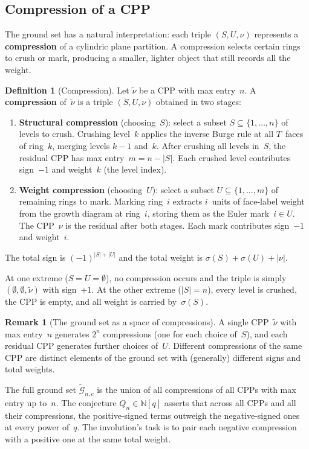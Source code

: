 \documentclass[11pt]{article}
\newcommand{\N}{\mathbb{N}}
\theoremstyle{plain}
\theoremstyle{definition}
\newtheorem{definition}[theorem]{Definition}
\newtheorem{remark}[theorem]{Remark}
\begin{document}
\subsection{Compression of a CPP}
\label{sec:compression}

The ground set has a natural interpretation: each triple
$(S, U, \nu)$ represents a \textbf{compression} of a cylindric
plane partition.  A compression selects certain rings to crush
or mark, producing a smaller, lighter object that still records
all the weight.

\begin{definition}[Compression]
\label{def:compression}
Let $\tilde{\nu}$ be a CPP with max entry~$n$.  A
\textbf{compression} of~$\tilde{\nu}$ is a triple
$(S, U, \nu)$ obtained in two stages:
\begin{enumerate}
  \item \textbf{Structural compression} (choosing~$S$): select a
    subset $S \subseteq \{1, \ldots, n\}$ of levels to crush.
    Crushing level~$k$ applies the inverse Burge rule at all
    $T$~faces of ring~$k$, merging levels $k{-}1$ and~$k$.  After
    crushing all levels in~$S$, the residual CPP has max
    entry~$m = n - |S|$.  Each crushed level contributes sign~$-1$
    and weight~$k$ (the level index).
  \item \textbf{Weight compression} (choosing~$U$): select a
    subset $U \subseteq \{1, \ldots, m\}$ of remaining rings to
    mark.  Marking ring~$i$ extracts $i$~units of face-label
    weight from the growth diagram at ring~$i$, storing them as
    the Euler mark~$i \in U$.  The CPP~$\nu$ is the residual
    after both stages.  Each mark contributes sign~$-1$ and
    weight~$i$.
\end{enumerate}
The total sign is $(-1)^{|S|+|U|}$ and the total weight is
$\sigma(S) + \sigma(U) + |\nu|$.
\end{definition}

\noindent
At one extreme ($S = U = \emptyset$), no compression occurs and
the triple is simply $(\emptyset, \emptyset, \tilde{\nu})$ with
sign~$+1$.  At the other extreme ($|S| = n$), every level is
crushed, the CPP is empty, and all weight is carried by~$\sigma(S)$.

\begin{remark}[The ground set as a space of compressions]
\label{rmk:compression-space}
A single CPP~$\tilde{\nu}$ with max entry~$n$ generates $2^n$
compressions (one for each choice of~$S$), and each residual CPP
generates further choices of~$U$.  Different compressions of the
same CPP are distinct elements of the ground set with
(generally) different signs and total weights.

The full ground set $\widetilde{\mathcal{G}}_{n,c}$ is the union
of all compressions of all CPPs with max entry up to~$n$.
The conjecture $Q_n \in \N[q]$ asserts that across all CPPs and
all their compressions, the positive-signed terms outweigh the
negative-signed ones at every power of~$q$.  The involution's
task is to pair each negative compression with a positive one at
the same total weight.
\end{remark}
\end{document}
